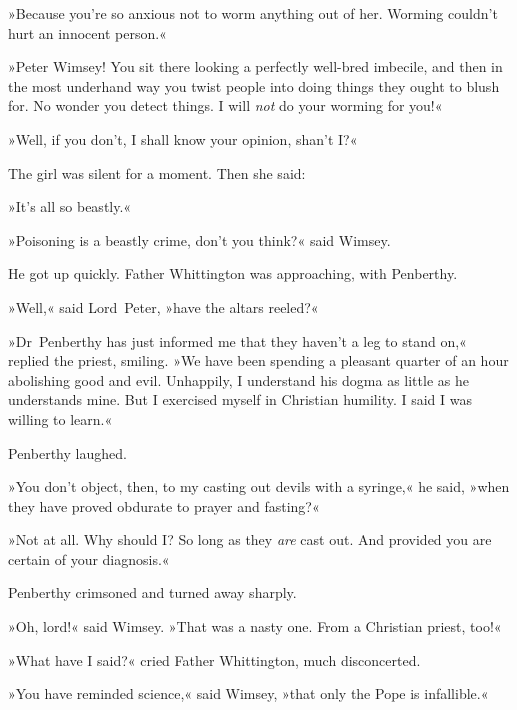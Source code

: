 »Because you're so anxious not to worm anything out of her. Worming couldn't hurt an innocent person.«

»Peter Wimsey! You sit there looking a perfectly well-bred imbecile, and then in the most underhand way you twist people into doing things they ought to blush for. No wonder you detect things. I will \textit{not} do your worming for you!«

»Well, if you don't, I shall know your opinion, shan't I?«

The girl was silent for a moment. Then she said:

»It's all so beastly.«

»Poisoning is a beastly crime, don't you think?« said Wimsey.

He got up quickly. Father Whittington was approaching, with Penberthy.

»Well,« said Lord~Peter, »have the altars reeled?«

»Dr~Penberthy has just informed me that they haven't a leg to stand on,« replied the priest, smiling. »We have been spending a pleasant quarter of an hour abolishing good and evil. Unhappily, I understand his dogma as little as he understands mine. But I exercised myself in Christian humility. I said I was willing to learn.«

Penberthy laughed.

»You don't object, then, to my casting out devils with a syringe,« he said, »when they have proved obdurate to prayer and fasting?«

»Not at all. Why should I? So long as they \textit{are} cast out. And provided you are certain of your diagnosis.«

Penberthy crimsoned and turned away sharply.

»Oh, lord!« said Wimsey. »That was a nasty one. From a Christian priest, too!«

»What have I said?« cried Father Whittington, much disconcerted.

»You have reminded science,« said Wimsey, »that only the Pope is infallible.«